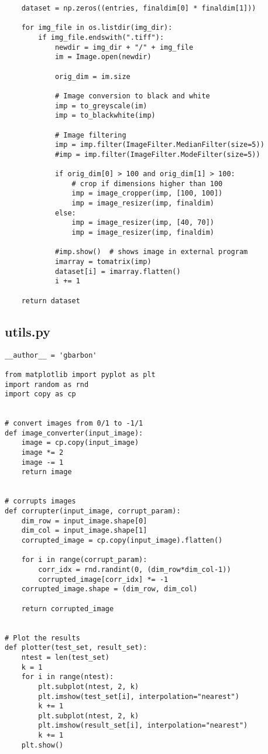\documentclass[letterpaper,twocolumn,10pt]{article}
\begin{document}
\begin{lstlisting}
    dataset = np.zeros((entries, finaldim[0] * finaldim[1]))

    for img_file in os.listdir(img_dir):
        if img_file.endswith(".tiff"):
            newdir = img_dir + "/" + img_file
            im = Image.open(newdir)

            orig_dim = im.size

            # Image conversion to black and white
            imp = to_greyscale(im)
            imp = to_blackwhite(imp)

            # Image filtering
            imp = imp.filter(ImageFilter.MedianFilter(size=5))
            #imp = imp.filter(ImageFilter.ModeFilter(size=5))

            if orig_dim[0] > 100 and orig_dim[1] > 100:
                # crop if dimensions higher than 100
                imp = image_cropper(imp, [100, 100])
                imp = image_resizer(imp, finaldim)
            else:
                imp = image_resizer(imp, [40, 70])
                imp = image_resizer(imp, finaldim)

            #imp.show()  # shows image in external program
            imarray = tomatrix(imp)
            dataset[i] = imarray.flatten()
            i += 1

    return dataset
\end{lstlisting}

\clearpage
\subsection{utils.py}
\begin{lstlisting}
__author__ = 'gbarbon'

from matplotlib import pyplot as plt
import random as rnd
import copy as cp


# convert images from 0/1 to -1/1
def image_converter(input_image):
    image = cp.copy(input_image)
    image *= 2
    image -= 1
    return image


# corrupts images
def corrupter(input_image, corrupt_param):
    dim_row = input_image.shape[0]
    dim_col = input_image.shape[1]
    corrupted_image = cp.copy(input_image).flatten()

    for i in range(corrupt_param):
        corr_idx = rnd.randint(0, (dim_row*dim_col-1))
        corrupted_image[corr_idx] *= -1
    corrupted_image.shape = (dim_row, dim_col)

    return corrupted_image


# Plot the results
def plotter(test_set, result_set):
    ntest = len(test_set)
    k = 1
    for i in range(ntest):
        plt.subplot(ntest, 2, k)
        plt.imshow(test_set[i], interpolation="nearest")
        k += 1
        plt.subplot(ntest, 2, k)
        plt.imshow(result_set[i], interpolation="nearest")
        k += 1
    plt.show()
\end{lstlisting}
\end{document}

